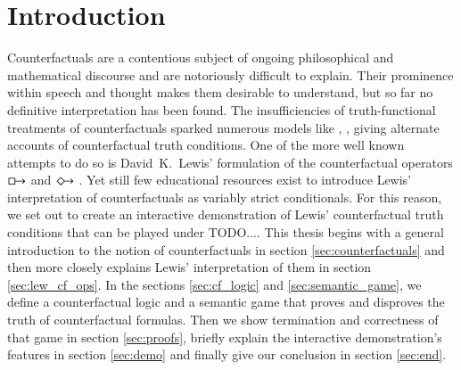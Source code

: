 \documentclass[a4paper,american,10pt]{paper}
\theoremstyle{definition}\newtheorem{definition}{Definition}
\begin{document}
\section{Introduction}
Counterfactuals are a contentious subject of ongoing philosophical and mathematical discourse and are notoriously difficult to explain. Their prominence within speech and thought makes them desirable to understand, but so far no definitive interpretation has been found. The insufficiencies of truth-functional treatments of counterfactuals sparked numerous models like \cite{kripke_modal_logic_1963}, \cite{stalnaker_theory_1968}, \cite{lewis_counterfactuals_1973} giving alternate accounts of counterfactual truth conditions. One of the more well known attempts to do so is David~K.~Lewis' formulation of the counterfactual operators $\boxright$ and $\Diamondright$ \cite{lewis_counterfactuals_1973}. Yet still few educational resources exist to introduce Lewis' interpretation of counterfactuals as variably strict conditionals. For this reason, we set out to create an interactive demonstration of Lewis' counterfactual truth conditions that can be played under TODO.... This thesis begins with a general introduction to the notion of counterfactuals in section \ref{sec:counterfactuals} and then more closely explains Lewis' interpretation of them in section \ref{sec:lew_cf_ops}. In the sections \ref{sec:cf_logic} and \ref{sec:semantic_game}, we define a counterfactual logic and a semantic game that proves and disproves the truth of counterfactual formulas. Then we show termination and correctness of that game in section \ref{sec:proofs}, briefly explain the interactive demonstration's features in section \ref{sec:demo} and finally give our conclusion in section \ref{sec:end}.
\end{document}
